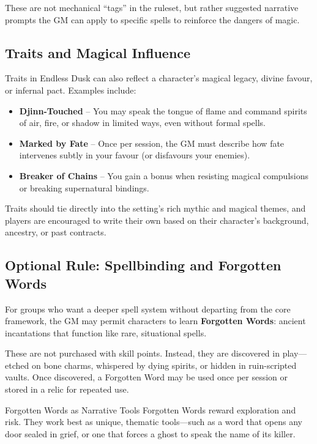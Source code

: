 These are not mechanical “tags” in the ruleset, but rather suggested narrative prompts the GM can apply to specific spells to reinforce the dangers of magic.

\subsection{Traits and Magical Influence}

Traits in Endless Dusk can also reflect a character’s magical legacy, divine favour, or infernal pact. Examples include:

\begin{itemize}\raggedright
    \item \textbf{Djinn-Touched} – You may speak the tongue of flame and command spirits of air, fire, or shadow in limited ways, even without formal spells.
    \item \textbf{Marked by Fate} – Once per session, the GM must describe how fate intervenes subtly in your favour (or disfavours your enemies).
    \item \textbf{Breaker of Chains} – You gain a bonus when resisting magical compulsions or breaking supernatural bindings.
\end{itemize}

Traits should tie directly into the setting’s rich mythic and magical themes, and players are encouraged to write their own based on their character’s background, ancestry, or past contracts.

\subsection{Optional Rule: Spellbinding and Forgotten Words}

For groups who want a deeper spell system without departing from the core framework, the GM may permit characters to learn \textbf{Forgotten Words}: ancient incantations that function like rare, situational spells.

These are not purchased with skill points. Instead, they are discovered in play—etched on bone charms, whispered by dying spirits, or hidden in ruin-scripted vaults. Once discovered, a Forgotten Word may be used once per session or stored in a relic for repeated use.

\begin{CommentBox}{Forgotten Words as Narrative Tools}
    Forgotten Words reward exploration and risk. They work best as unique, thematic tools—such as a word that opens any door sealed in grief, or one that forces a ghost to speak the name of its killer.
\end{CommentBox}

